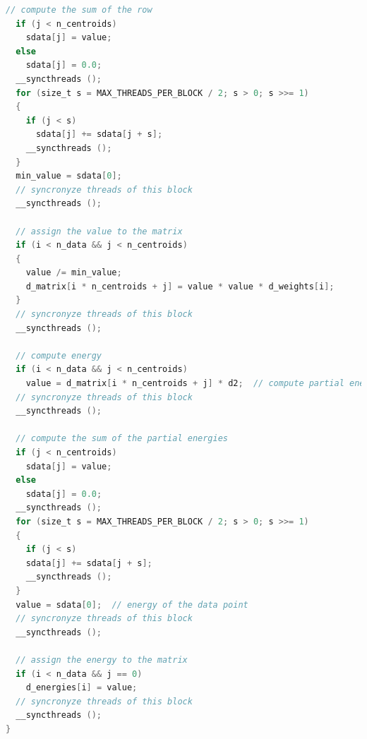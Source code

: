 \begin{lstlisting}[style=code, language=C, rulecolor=\color{blue}]
  // compute the sum of the row
  if (j < n_centroids)
    sdata[j] = value;
  else
    sdata[j] = 0.0;
  __syncthreads ();
  for (size_t s = MAX_THREADS_PER_BLOCK / 2; s > 0; s >>= 1)
  {
    if (j < s)
      sdata[j] += sdata[j + s];
    __syncthreads ();
  }
  min_value = sdata[0];
  // syncronyze threads of this block
  __syncthreads ();

  // assign the value to the matrix
  if (i < n_data && j < n_centroids)
  {
    value /= min_value;
    d_matrix[i * n_centroids + j] = value * value * d_weights[i];
  }
  // syncronyze threads of this block
  __syncthreads ();

  // compute energy
  if (i < n_data && j < n_centroids)
    value = d_matrix[i * n_centroids + j] * d2;  // compute partial energy
  // syncronyze threads of this block
  __syncthreads ();

  // compute the sum of the partial energies
  if (j < n_centroids)
    sdata[j] = value;
  else
    sdata[j] = 0.0;
  __syncthreads ();
  for (size_t s = MAX_THREADS_PER_BLOCK / 2; s > 0; s >>= 1)
  {
    if (j < s)
    sdata[j] += sdata[j + s];
    __syncthreads ();
  }
  value = sdata[0];  // energy of the data point
  // syncronyze threads of this block
  __syncthreads ();

  // assign the energy to the matrix
  if (i < n_data && j == 0)
    d_energies[i] = value;
  // syncronyze threads of this block
  __syncthreads ();
}\end{lstlisting}
